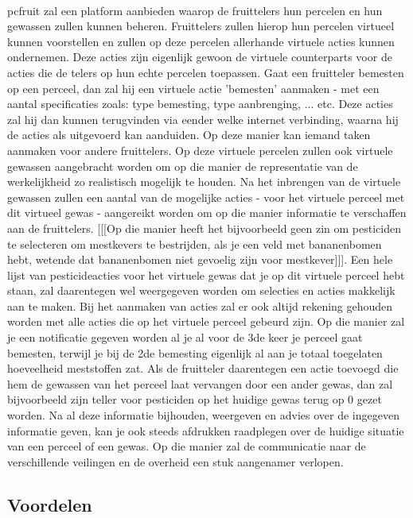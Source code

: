 \paragraph {} pcfruit zal een platform aanbieden waarop de fruittelers hun percelen en hun gewassen zullen kunnen beheren. Fruittelers zullen hierop hun percelen virtueel kunnen voorstellen en zullen op deze percelen allerhande virtuele acties kunnen ondernemen. Deze acties zijn eigenlijk gewoon de virtuele counterparts voor de acties die de telers op hun echte percelen toepassen. Gaat een fruitteler bemesten op een perceel, dan zal hij een virtuele actie 'bemesten' aanmaken - met een aantal specificaties zoals: type bemesting, type aanbrenging, ... etc. Deze acties zal hij dan kunnen terugvinden via eender welke internet verbinding, waarna hij de acties als uitgevoerd kan aanduiden. Op deze manier kan iemand taken aanmaken voor andere fruittelers. Op deze virtuele percelen zullen ook virtuele gewassen aangebracht worden om op die manier de representatie van de werkelijkheid zo realistisch mogelijk te houden. Na het inbrengen van de virtuele gewassen zullen een aantal van de mogelijke acties - voor het virtuele perceel met dit virtueel gewas - aangereikt worden om op die manier informatie te verschaffen aan de fruittelers. [[[Op die manier heeft het bijvoorbeeld geen zin om pesticiden te selecteren om mestkevers te bestrijden, als je een veld met bananenbomen hebt, wetende dat bananenbomen niet gevoelig zijn voor mestkever]]]. Een hele lijst van pesticideacties voor het virtuele gewas dat je op dit virtuele perceel hebt staan, zal daarentegen wel weergegeven worden om selecties en acties makkelijk aan te maken. Bij het aanmaken van acties zal er ook altijd rekening gehouden worden met alle acties die op het virtuele perceel gebeurd zijn. Op die manier zal je een notificatie gegeven worden al je al voor de 3de keer je perceel gaat bemesten, terwijl je bij de 2de bemesting eigenlijk al aan je totaal toegelaten hoeveelheid meststoffen zat. Als de fruitteler daarentegen een actie toevoegd die hem de gewassen van het perceel laat vervangen door een ander gewas, dan zal bijvoorbeeld zijn teller voor pesticiden op het huidige gewas terug op 0 gezet worden. Na al deze informatie bijhouden, weergeven en advies over de ingegeven informatie geven, kan je ook steeds afdrukken raadplegen over de huidige situatie van een perceel of een gewas. Op die manier zal de communicatie naar de verschillende veilingen en de overheid een stuk aangenamer verlopen.

\subsection {Voordelen}

